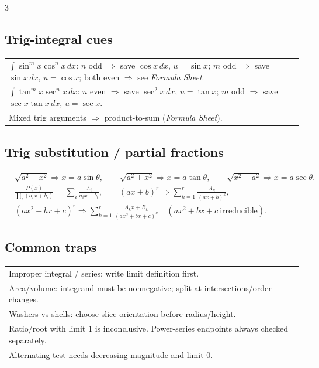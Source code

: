 \documentclass[10pt]{article}
\newcommand{\FS}{\textit{Formula Sheet}}
\newcommand{\dx}{\,dx}
\begin{document}
\begin{multicols}{3}
\subsection*{Trig-integral cues}
\begin{tabular}{@{}p{}@{}}
$\int \sin^m x\cos^n x\dx$: $n$ odd $\Rightarrow$ save $\cos x\dx$, $u=\sin x$; $m$ odd $\Rightarrow$ save $\sin x\dx$, $u=\cos x$; both even $\Rightarrow$ see \FS.\\
$\int \tan^m x\sec^n x\dx$: $n$ even $\Rightarrow$ save $\sec^2x\dx$, $u=\tan x$; $m$ odd $\Rightarrow$ save $\sec x\tan x\dx$, $u=\sec x$.\\
Mixed trig arguments $\Rightarrow$ product-to-sum (\FS).\\
\end{tabular}

\subsection*{Trig substitution / partial fractions}
\begin{align*}
&\sqrt{a^2-x^2}\Rightarrow x=a\sin\theta,\qquad
\sqrt{a^2+x^2}\Rightarrow x=a\tan\theta,\qquad
\sqrt{x^2-a^2}\Rightarrow x=a\sec\theta.\\
&\frac{P(x)}{\prod_i(a_ix+b_i)}=\sum_i\frac{A_i}{a_ix+b_i},\qquad
(ax+b)^r\Rightarrow \sum_{k=1}^r \frac{A_k}{(ax+b)^k},\\
&(ax^2+bx+c)^r\Rightarrow \sum_{k=1}^r \frac{A_kx+B_k}{(ax^2+bx+c)^k}\quad (ax^2+bx+c\ \text{irreducible}).
\end{align*}

\subsection*{Common traps}
\begin{tabular}{@{}p{}@{}}
Improper integral / series: write limit definition first.\\
Area/volume: integrand must be nonnegative; split at intersections/order changes.\\
Washers vs shells: choose slice orientation before radius/height.\\
Ratio/root with limit $1$ is inconclusive. Power-series endpoints always checked separately.\\
Alternating test needs decreasing magnitude and limit $0$.\\
\end{tabular}

\end{multicols}
\end{document}
